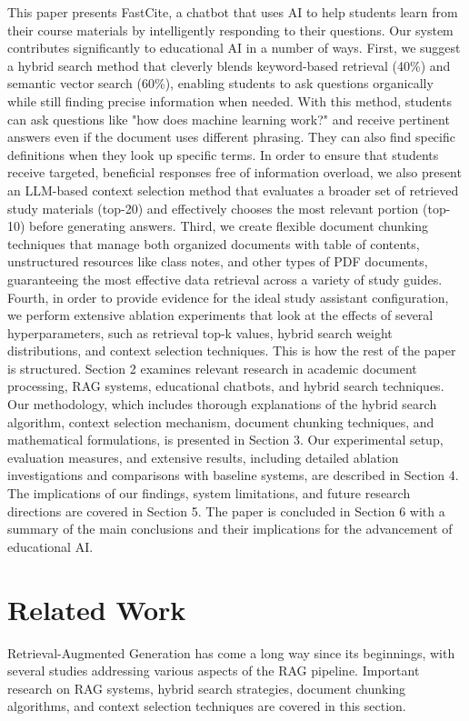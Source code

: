 \documentclass[runningheads]{llncs}
\begin{document}
This paper presents FastCite, a chatbot that uses AI to help students learn from their course materials by intelligently responding to their questions. Our system contributes significantly to educational AI in a number of ways. First, we suggest a hybrid search method that cleverly blends keyword-based retrieval (40\%) and semantic vector search (60\%), enabling students to ask questions organically while still finding precise information when needed. With this method, students can ask questions like "how does machine learning work?" and receive pertinent answers even if the document uses different phrasing. They can also find specific definitions when they look up specific terms. In order to ensure that students receive targeted, beneficial responses free of information overload, we also present an LLM-based context selection method that evaluates a broader set of retrieved study materials (top-20) and effectively chooses the most relevant portion (top-10) before generating answers. Third, we create flexible document chunking techniques that manage both organized documents with table of contents, unstructured resources like class notes, and other types of PDF documents, guaranteeing the most effective data retrieval across a variety of study guides. Fourth, in order to provide evidence for the ideal study assistant configuration, we perform extensive ablation experiments that look at the effects of several hyperparameters, such as retrieval top-k values, hybrid search weight distributions, and context selection techniques.
This is how the rest of the paper is structured. Section 2 examines relevant research in academic document processing, RAG systems, educational chatbots, and hybrid search techniques. Our methodology, which includes thorough explanations of the hybrid search algorithm, context selection mechanism, document chunking techniques, and mathematical formulations, is presented in Section 3. Our experimental setup, evaluation measures, and extensive results, including detailed ablation investigations and comparisons with baseline systems, are described in Section 4. The implications of our findings, system limitations, and future research directions are covered in Section 5. The paper is concluded in Section 6 with a summary of the main conclusions and their implications for the advancement of educational AI.
%
%
\section{Related Work}
Retrieval-Augmented Generation has come a long way since its beginnings, with several studies addressing various aspects of the RAG pipeline. Important research on RAG systems, hybrid search strategies, document chunking algorithms, and context selection techniques are covered in this section.
\end{document}
